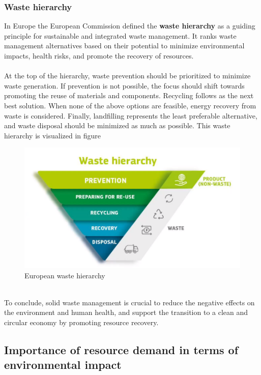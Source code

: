 \documentclass[../summary.tex]{subfiles}
\begin{document}
	\subsubsection{Waste hierarchy}
	
	In Europe the European Commission defined the \textbf{waste hierarchy} as a guiding principle for sustainable and integrated waste management. It ranks waste management alternatives based on their potential to minimize environmental impacts, health risks, and promote the recovery of resources. \\
	\\
	At the top of the hierarchy, waste prevention should be prioritized to minimize waste generation. If prevention is not possible, the focus should shift towards promoting the reuse of materials and components. Recycling follows as the next best solution. When none of the above options are feasible, energy recovery from waste is considered. Finally, landfilling represents the least preferable alternative, and waste disposal should be minimized as much as possible. This waste hierarchy is visualized in figure
	
	\begin{figure}[H]
		\centering
		\includegraphics[width=0.7\linewidth]{../images/5-waste-hierarchy}
		\caption{European waste hierarchy}
		\label{fig:5-waste-hierarchy}
	\end{figure}
	
	\ \\
	To conclude, solid waste management is crucial to reduce the negative effects on the environment and human health, and support the transition to a clean and circular economy by promoting resource recovery.  
	\newpage
	
	\subsection{Importance of resource demand in terms of environmental impact}
	
\end{document}

